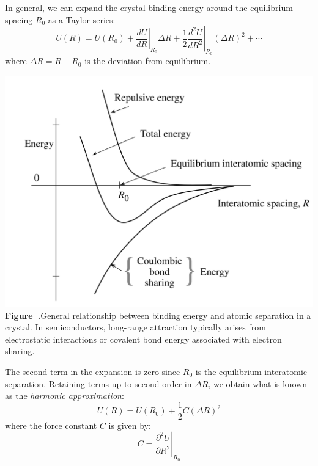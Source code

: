 In general, we can expand the crystal binding energy around the equilibrium spacing \( R_0 \) as a Taylor series:
\begin{equation}
	U(R) = U(R_0) + \left.\frac{dU}{dR}\right|_{R_0} \Delta R + \frac{1}{2} \left.\frac{d^2 U}{dR^2}\right|_{R_0} (\Delta R)^2 + \cdots
\end{equation}
\noindent
where \( \Delta R = R - R_0 \) is the deviation from equilibrium.
\begin{center}
	\begin{minipage}{0.6\textwidth}
		\centering
		\includegraphics[width=\textwidth]{img/Potential_Energy.png}
		\\[0.5em]
		\textbf{Figure~\thefigure.}General relationship between binding energy and atomic separation in a crystal. In semiconductors, long-range attraction typically arises from electrostatic interactions or covalent bond energy associated with electron sharing.
		\label{fig:Potential_Energy}
	\end{minipage}
\end{center}
The second term in the expansion is zero since \( R_0 \) is the equilibrium interatomic separation. Retaining terms up to second order in \( \Delta R \), we obtain what is known as the \textit{harmonic approximation}:
\begin{equation}
	U(R) = U(R_0) + \frac{1}{2} C (\Delta R)^2
\end{equation}
where the force constant \( C \) is given by:
\begin{equation}
	C = \left. \frac{\partial^2 U}{\partial R^2} \right|_{R_0}
\end{equation}
